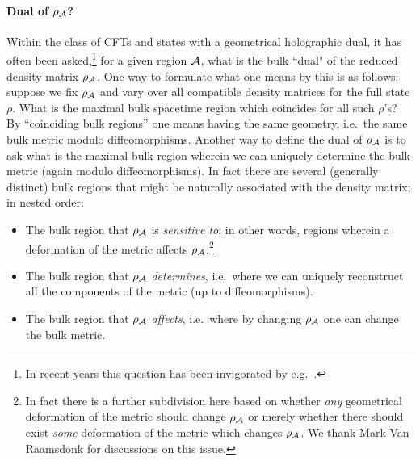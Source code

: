 \documentclass[12pt]{article}
\def\regA{{\cal A}}
\def\rhoA{{\rho_{\regA}}}
\begin{document}
\paragraph{Dual of $\rhoA$?}
Within the class of CFTs and states with a geometrical holographic dual, it has often been asked,\footnote{ In recent years this question has been invigorated by e.g.\ \cite{Bousso:2012sj,Czech:2012bh}.  
} for a given region $\regA$, what is the bulk ``dual" of the reduced density matrix $\rhoA$.  One way to formulate what one means by this is as follows: suppose we fix $\rhoA$ and vary over all compatible density matrices for the full state $\rho$.  What is the maximal bulk spacetime region which coincides for all such $\rho$'s?  By ``coinciding bulk regions'' one means having the same geometry, i.e.\ the same bulk metric modulo diffeomorphisms. Another way to define the dual of $\rhoA$ is to ask what is the maximal bulk region wherein we can uniquely determine the bulk metric (again modulo diffeomorphisms).
In fact there  are several (generally distinct) bulk regions that might be naturally associated with the density matrix;  in nested order:
\begin{itemize}
\item The bulk region that $\rhoA$ is {\it sensitive to}; in other words, regions wherein a deformation of the metric affects $\rhoA$.\footnote{ 
In fact there is a further subdivision here based on whether {\it any }geometrical deformation of the metric should change $\rhoA$ or merely whether there should exist {\it some} deformation of the metric which changes $\rhoA$.
We thank Mark Van Raamsdonk for discussions on this issue.
}
\item The bulk region that $\rhoA$ {\it determines}, i.e.\ where we can uniquely reconstruct all the components of the metric (up to diffeomorphisms).
\item The bulk region that $\rhoA$ {\it affects}, i.e.\ where by changing $\rhoA$ one can change the bulk metric.  
\end{itemize}
\end{document}
